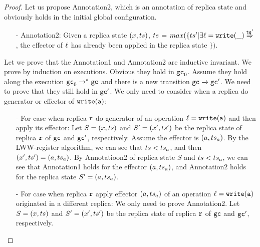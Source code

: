 \begin {proof}
Let us propose Annotation2, which is an annotation of replica state and obviously holds in the initial global configuration.

\begin{itemize}
\setlength{\itemsep}{0.5pt}
\item[-] Annotation2: Given a replica state $(x,ts)$, $ts$ = $max(\{ \ats' \vert \exists \alabel = \alabellongind[{\tt write}]{\_}{}{\ats'}{}$, the effector of $\ell$ has already been applied in the replica state $ \})$. 
\end{itemize} 


Let we prove that the Annotation1 and Annotation2 are inductive invariant. We prove by induction on executions. Obvious they hold in $\mathtt{gc}_0$. Assume they hold along the execution $\mathtt{gc}_0 \xrightarrow{}^* \mathtt{gc}$ and there is a new transition $\mathtt{gc} \xrightarrow{} \mathtt{gc}'$. We need to prove that they still hold in $\mathtt{gc}'$. We only need to consider when a replica do generator or effector of $\alabelshort[{\tt write}]{a}$:

\begin{itemize}
\setlength{\itemsep}{0.5pt}
\item[-] For case when replica $\mathtt{r}$ do generator of an operation $\alabel = \alabelshort[{\tt write}]{a}$ and then apply its effector: Let $S=(x,ts)$ and $S'=(x',ts')$ be the replica state of replica $\mathtt{r}$ of $\mathtt{gc}$ and $\mathtt{gc}'$, respectively. Assume the effector is $(a,ts_a)$. By the LWW-register algorithm, we can see that $ts<ts_a$, and then $(x',ts')=(a,ts_a)$. By Annotatioon2 of replica state $S$ and $ts<ts_a$, we can see that Annotation1 holds for the effector $(a,ts_a)$, and Annotation2 holds for the replica state $S'=(a,ts_a)$.

\item[-] For case when replica $\mathtt{r}$ apply effector $(a,ts_a)$ of an operation $\alabel = \alabelshort[{\tt write}]{a}$ originated in a different replica: We only need to prove Annotation2. Let $S=(x,ts)$ and $S'=(x',ts')$ be the replica state of replica $\mathtt{r}$ of $\mathtt{gc}$ and $\mathtt{gc}'$, respectively.


\end{itemize}
\end{proof}
